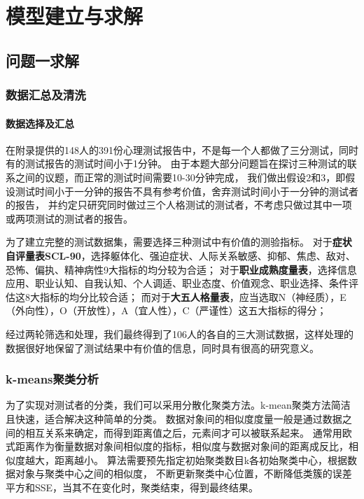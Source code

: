 \documentclass[withoutpreface,bwprint]{cumcmthesis} %
\begin{document}
\section{模型建立与求解}

\subsection{问题一求解}

\subsubsection{数据汇总及清洗}
\paragraph*{数据选择及汇总}
在附录提供的148人的391份心理测试报告中，不是每一个人都做了三分测试，同时有的测试报告的测试时间小于1分钟。
由于本题大部分问题旨在探讨三种测试的联系之间的议题，而正常的测试时间需要10-30分钟完成\cite{SCL-90}\cite{The Career Development Quarterly}\cite{The Big Five trait taxonomy}，
我们做出假设2和3，即假设测试时间小于一分钟的报告不具有参考价值，舍弃测试时间小于一分钟的测试者的报告，
并约定只研究同时做过三个人格测试的测试者，不考虑只做过其中一项或两项测试的测试者的报告。

为了建立完整的测试数据集，需要选择三种测试中有价值的测验指标。
对于\textbf{症状自评量表SCL-90}，选择躯体化、强迫症状、人际关系敏感、抑郁、焦虑、敌对、恐怖、偏执、精神病性9大指标的均分较为合适；
对于\textbf{职业成熟度量表}，选择信息应用、职业认知、自我认知、个人调适、职业态度、价值观念、职业选择、条件评估这8大指标的均分比较合适；
而对于\textbf{大五人格量表}，应当选取N（神经质），E（外向性），O（开放性），A（宜人性），C（严谨性）这五大指标的得分；

经过两轮筛选和处理，我们最终得到了106人的各自的三大测试数据，这样处理的数据很好地保留了测试结果中有价值的信息，同时具有很高的研究意义。


\subsubsection{k-means聚类分析}

为了实现对测试者的分类，我们可以采用分散化聚类方法。k-mean聚类方法简洁且快速，适合解决这种简单的分类。
数据对象间的相似度度量一般是通过数据之间的相互关系来确定，而得到距离值之后，元素间才可以被联系起来。
通常用欧式距离作为衡量数据对象间相似度的指标，相似度与数据对象间的距离成反比，相似度越大，距离越小。
算法需要预先指定初始聚类数目k各初始聚类中心，根据数据对象与聚类中心之间的相似度，
不断更新聚类中心位置，不断降低类簇的误差平方和SSE，当其不在变化时，聚类结束，得到最终结果。
\end{document}

